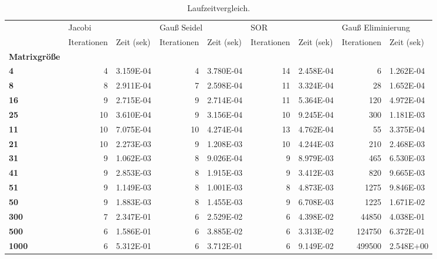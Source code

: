 \begin{table}[h!]
\centering
\caption{Laufzeitvergleich.}
\label{laufzeit}
\begin{tabular}{lrlrlrlrl}
\toprule
{} & \multicolumn{2}{l}{Jacobi} & \multicolumn{2}{l}{Gauß Seidel} & \multicolumn{2}{l}{SOR} & \multicolumn{2}{l}{Gauß Eliminierung} \\
{} & Iterationen & Zeit (sek) & Iterationen & Zeit (sek) & Iterationen & Zeit (sek) &       Iterationen & Zeit (sek) \\
\textbf{Matrixgröße} &             &            &             &            &             &            &                   &            \\
\midrule
\textbf{4          } &           4 &  3.159E-04 &           4 &  3.780E-04 &          14 &  2.458E-04 &                 6 &  1.262E-04 \\
\textbf{8          } &           8 &  2.911E-04 &           7 &  2.598E-04 &          11 &  3.324E-04 &                28 &  1.652E-04 \\
\textbf{16         } &           9 &  2.715E-04 &           9 &  2.714E-04 &          11 &  5.364E-04 &               120 &  4.972E-04 \\
\textbf{25         } &          10 &  3.610E-04 &           9 &  3.156E-04 &          10 &  9.245E-04 &               300 &  1.181E-03 \\
\textbf{11         } &          10 &  7.075E-04 &          10 &  4.274E-04 &          13 &  4.762E-04 &                55 &  3.375E-04 \\
\textbf{21         } &          10 &  2.273E-03 &           9 &  1.208E-03 &          10 &  4.244E-03 &               210 &  2.468E-03 \\
\textbf{31         } &           9 &  1.062E-03 &           8 &  9.026E-04 &           9 &  8.979E-03 &               465 &  6.530E-03 \\
\textbf{41         } &           9 &  2.853E-03 &           8 &  1.915E-03 &           9 &  3.412E-03 &               820 &  9.665E-03 \\
\textbf{51         } &           9 &  1.149E-03 &           8 &  1.001E-03 &           8 &  4.873E-03 &              1275 &  9.846E-03 \\
\textbf{50         } &           9 &  1.883E-03 &           8 &  1.455E-03 &           9 &  6.708E-03 &              1225 &  1.671E-02 \\
\textbf{300        } &           7 &  2.347E-01 &           6 &  2.529E-02 &           6 &  4.398E-02 &             44850 &  4.038E-01 \\
\textbf{500        } &           6 &  1.586E-01 &           6 &  3.885E-02 &           6 &  3.313E-02 &            124750 &  6.372E-01 \\
\textbf{1000       } &           6 &  5.312E-01 &           6 &  3.712E-01 &           6 &  9.149E-02 &            499500 &  2.548E+00 \\
\bottomrule
\end{tabular}
\end{table}
